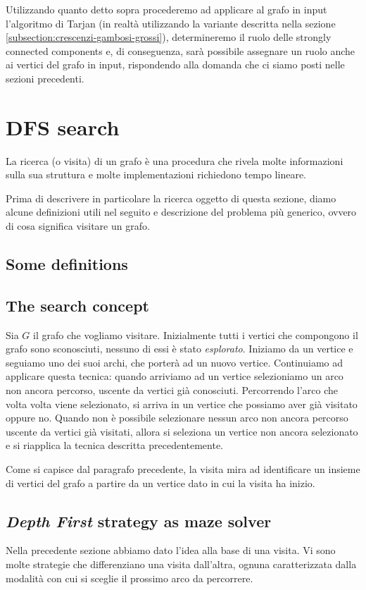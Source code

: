 Utilizzando quanto detto sopra procederemo ad applicare al grafo in
input l'algoritmo di Tarjan (in realt\`a utilizzando la variante
descritta nella sezione \ref{subsection:crescenzi-gambosi-grossi}),
determineremo il ruolo delle strongly connected components e, di
conseguenza, sar\`a possibile assegnare un ruolo anche ai vertici del
grafo in input, rispondendo alla domanda che ci siamo posti nelle
sezioni precedenti.

\section{DFS search}

La ricerca (o visita) di un grafo \`e una procedura che rivela molte
informazioni sulla sua struttura e molte implementazioni richiedono
tempo lineare.

Prima di descrivere in particolare la ricerca oggetto di questa
sezione, diamo alcune definizioni utili nel seguito e descrizione del
problema pi\`u generico, ovvero di cosa significa visitare un grafo.

\subsection{Some definitions}
\label{subsection:some-definitions}

\subsection{The search concept}
Sia $G$ il grafo che vogliamo visitare. Inizialmente tutti i vertici
che compongono il grafo sono sconosciuti, nessuno di essi \`e stato
\emph{esplorato}. Iniziamo da un vertice e seguiamo uno dei suoi
archi, che porter\`a ad un nuovo vertice. Continuiamo ad applicare
questa tecnica: quando arriviamo ad un vertice selezioniamo un arco
non ancora percorso, uscente da vertici gi\`a conosciuti. Percorrendo
l'arco che volta volta viene selezionato, si arriva in un vertice che
possiamo aver gi\`a visitato oppure no. Quando non \`e possibile
selezionare nessun arco non ancora percorso uscente da vertici gi\`a
visitati, allora si seleziona un vertice non ancora selezionato e si
riapplica la tecnica descritta precedentemente.

Come si capisce dal paragrafo precedente, la visita mira ad
identificare un insieme di vertici del grafo a partire da un vertice
dato in cui la visita ha inizio.

\subsection{\emph{Depth First} strategy as maze solver}
Nella precedente sezione abbiamo dato l'idea alla base di una
visita. Vi sono molte strategie che differenziano una visita
dall'altra, ognuna caratterizzata dalla modalit\`a con cui si sceglie
il prossimo arco da percorrere.

